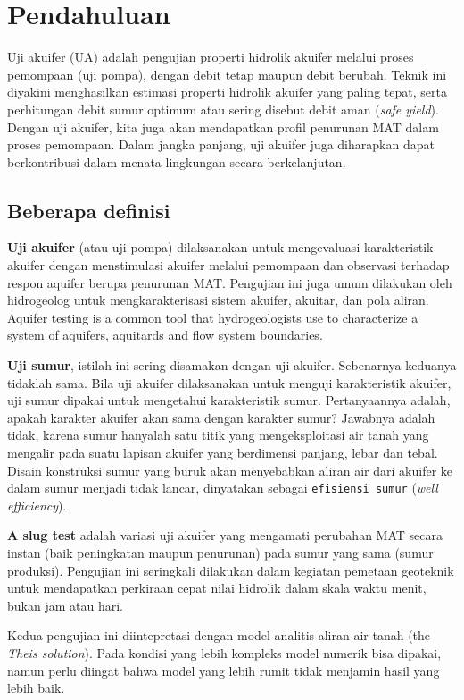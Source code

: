 \section{Pendahuluan}

Uji akuifer (UA) adalah pengujian properti hidrolik akuifer melalui proses pemompaan (uji pompa), dengan debit tetap maupun debit berubah. Teknik ini diyakini menghasilkan estimasi properti hidrolik akuifer yang paling tepat, serta perhitungan debit sumur optimum atau sering disebut debit aman (\textit{safe yield}). Dengan uji akuifer, kita juga akan mendapatkan profil penurunan MAT dalam proses pemompaan. Dalam jangka panjang, uji akuifer juga diharapkan dapat berkontribusi dalam menata lingkungan secara berkelanjutan. 


\subsection{Beberapa definisi}

\textbf{Uji akuifer} (atau uji pompa) dilaksanakan untuk mengevaluasi karakteristik akuifer dengan menstimulasi akuifer melalui pemompaan dan observasi terhadap respon aquifer berupa penurunan MAT. Pengujian ini juga umum dilakukan oleh hidrogeolog untuk mengkarakterisasi sistem akuifer, akuitar, dan pola aliran. Aquifer testing is a common tool that hydrogeologists use to characterize a system of aquifers, aquitards and flow system boundaries.

\textbf{Uji sumur}, istilah ini sering disamakan dengan uji akuifer. Sebenarnya keduanya tidaklah sama. Bila uji akuifer dilaksanakan untuk menguji karakteristik akuifer, uji sumur dipakai untuk mengetahui karakteristik sumur. Pertanyaannya adalah, apakah karakter akuifer akan sama dengan karakter sumur? Jawabnya adalah tidak, karena sumur hanyalah satu titik yang mengeksploitasi air tanah yang mengalir pada suatu lapisan akuifer yang berdimensi panjang, lebar dan tebal. Disain konstruksi sumur yang buruk akan menyebabkan aliran air dari akuifer ke dalam sumur menjadi tidak lancar, dinyatakan sebagai \verb|efisiensi sumur| (\textit{well efficiency}).

\textbf{A slug test} adalah variasi uji akuifer yang mengamati perubahan MAT secara instan (baik peningkatan maupun penurunan) pada sumur yang sama (sumur produksi). Pengujian ini seringkali dilakukan dalam kegiatan pemetaan geoteknik untuk mendapatkan perkiraan cepat nilai hidrolik dalam skala waktu menit, bukan jam atau hari. 

Kedua pengujian ini diintepretasi dengan model analitis  aliran air tanah (the \textit{Theis solution}). Pada kondisi yang lebih kompleks model numerik bisa dipakai\cite{lebbe1995validation}, namun perlu diingat bahwa model yang lebih rumit tidak menjamin hasil yang lebih baik\cite{Johnson_2001}\cite{Rushton_1976}\cite{Rathod_1984}\cite{2011}\cite{Lebbe_1999}\cite{Lebbe_1999}. 

